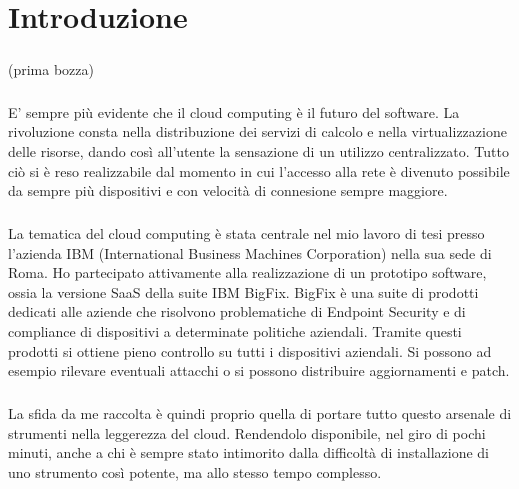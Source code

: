 \chapter{Introduzione}

\paragraph{}
(prima bozza)

\paragraph{}
E' sempre più evidente che il cloud computing è il futuro del software. La rivoluzione consta nella distribuzione dei servizi di calcolo e nella virtualizzazione delle risorse, dando così all'utente la sensazione di un utilizzo centralizzato. Tutto ciò si è reso realizzabile dal momento in cui l'accesso alla rete è divenuto possibile da sempre più dispositivi e con velocità di connesione sempre maggiore.
\paragraph{}
La tematica del cloud computing è stata centrale nel mio lavoro di tesi presso l'azienda IBM (International Business Machines Corporation) nella sua sede di Roma. Ho partecipato attivamente alla realizzazione di un prototipo software, ossia la versione SaaS della suite IBM BigFix. BigFix è una suite di prodotti dedicati alle aziende che risolvono problematiche di Endpoint Security e di compliance di dispositivi a determinate politiche aziendali. Tramite questi prodotti si ottiene pieno controllo su tutti i dispositivi aziendali. Si possono ad esempio rilevare eventuali attacchi o si possono distribuire aggiornamenti e patch.
\paragraph{}
La sfida da me raccolta è quindi proprio quella di portare tutto questo arsenale di strumenti nella leggerezza del cloud. Rendendolo disponibile, nel giro di pochi minuti, anche a chi è sempre stato intimorito dalla difficoltà di installazione di uno strumento così potente, ma allo stesso tempo complesso.